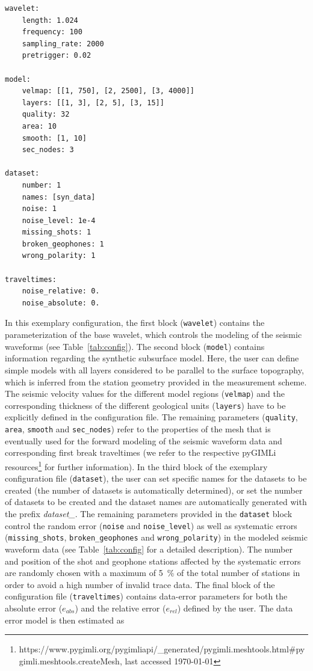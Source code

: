 \documentclass[a4paper,fleqn]{cas-sc}
\begin{document}
\begin{footnotesize}
\begin{verbatim}
wavelet:
    length: 1.024
    frequency: 100
    sampling_rate: 2000
    pretrigger: 0.02

model:
    velmap: [[1, 750], [2, 2500], [3, 4000]]
    layers: [[1, 3], [2, 5], [3, 15]]
    quality: 32
    area: 10
    smooth: [1, 10]
    sec_nodes: 3    

dataset:
    number: 1
    names: [syn_data]
    noise: 1
    noise_level: 1e-4
    missing_shots: 1
    broken_geophones: 1
    wrong_polarity: 1
    
traveltimes:
    noise_relative: 0.
    noise_absolute: 0.
\end{verbatim}
\end{footnotesize}

In this exemplary configuration, the first block (\texttt{wavelet}) contains the parameterization of the base wavelet, which controls the modeling of the seismic waveforms (see Table~\ref{tab:config}).
The second block (\texttt{model}) contains information regarding the synthetic subsurface model. Here, the user can define simple models with all layers considered to be parallel to the surface topography, which is inferred from the station geometry provided in the measurement scheme. The seismic velocity values for the different model regions (\texttt{velmap}) and the corresponding thickness of the different geological units (\texttt{layers}) have to be explicitly defined in the configuration file. The remaining parameters (\texttt{quality}, \texttt{area}, \texttt{smooth} and \texttt{sec\_nodes}) refer to the properties of the mesh that is eventually used for the forward modeling of the seismic waveform data and corresponding first break traveltimes (we refer to the respective pyGIMLi resources\footnote{https://www.pygimli.org/pygimliapi/\_generated/pygimli.meshtools.html\#pygimli.meshtools.createMesh, last accessed \today} for further information).
In the third block of the exemplary configuration file (\texttt{dataset}), the user can set specific names for the datasets to be created (the number of datasets is automatically determined), or set the number of datasets to be created and the dataset names are automatically generated with the prefix \textit{dataset\_}.
The remaining parameters provided in the \texttt{dataset} block control the random error (\texttt{noise} and \texttt{noise\_level}) as well as systematic errors (\texttt{missing\_shots}, \texttt{broken\_geophones} and \texttt{wrong\_polarity}) in the modeled seismic waveform data (see Table~\ref{tab:config} for a detailed description).
The number and position of the shot and geophone stations affected by the systematic errors are randomly chosen with a maximum of \qty{5}{\%} of the total number of stations in order to avoid a high number of invalid trace data.
The final block of the configuration file (\texttt{traveltimes}) contains data-error parameters for both the absolute error ($e_{abs}$) and the relative error ($e_{rel}$) defined by the user. The data error model is then estimated as
\end{document}
